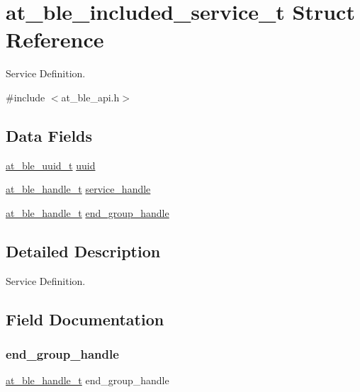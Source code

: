 \hypertarget{structat__ble__included__service__t}{}\section{at\+\_\+ble\+\_\+included\+\_\+service\+\_\+t Struct Reference}
\label{structat__ble__included__service__t}


Service Definition.  




{\ttfamily \#include $<$at\+\_\+ble\+\_\+api.\+h$>$}

\subsection*{Data Fields}
\begin{DoxyCompactItemize}
\item 
\mbox{\hyperlink{structat__ble__uuid__t}{at\+\_\+ble\+\_\+uuid\+\_\+t}} \mbox{\hyperlink{structat__ble__included__service__t_a679a8e56540040619aee07eb7a743859}{uuid}}
\item 
\mbox{\hyperlink{at__ble__api_8h_abd23646d0c662860741f787efc8456f2}{at\+\_\+ble\+\_\+handle\+\_\+t}} \mbox{\hyperlink{structat__ble__included__service__t_a0c715587b85af2e83ed074e596f79f32}{service\+\_\+handle}}
\item 
\mbox{\hyperlink{at__ble__api_8h_abd23646d0c662860741f787efc8456f2}{at\+\_\+ble\+\_\+handle\+\_\+t}} \mbox{\hyperlink{structat__ble__included__service__t_a989ccf65a59114246aea671d77424ce9}{end\+\_\+group\+\_\+handle}}
\end{DoxyCompactItemize}


\subsection{Detailed Description}
Service Definition. 

\subsection{Field Documentation}
\mbox{\label{structat__ble__included__service__t_a989ccf65a59114246aea671d77424ce9}} 
\subsubsection{\texorpdfstring{end\_group\_handle}{end\_group\_handle}}
{\footnotesize\ttfamily \mbox{\hyperlink{at__ble__api_8h_abd23646d0c662860741f787efc8456f2}{at\+\_\+ble\+\_\+handle\+\_\+t}} end\+\_\+group\+\_\+handle}

